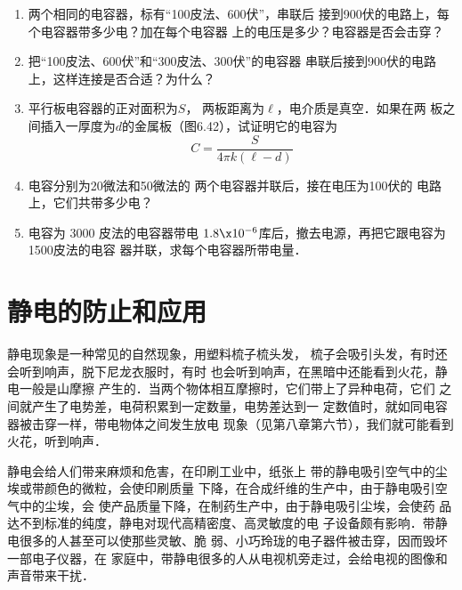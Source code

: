 \begin{enumerate}
\item 两个相同的电容器，标有“100皮法、600伏”，串联后
接到900伏的电路上，每个电容器带多少电？加在每个电容器
上的电压是多少？电容器是否会击穿？
\item 把“100皮法、600伏”和“300皮法、300伏”的电容器
串联后接到900伏的电路上，这样连接是否合适？为什么？
\item 平行板电容器的正对面积为$S$，
两板距离为$\ell$，电介质是真空．如果在两
板之间插入一厚度为$d$的金属板（图6.42），试证明它的电容为
\[C=\frac{S}{4\pi k(\ell-d)}\]
\begin{figure}[htp]\centering

    \caption{}
\end{figure}
\item 电容分别为20微法和50微法的
两个电容器并联后，接在电压为100伏的
电路上，它们共带多少电？
\item 电容为 3000 皮法的电容器带电
$1.8\x10^{-6}$库后，撤去电源，再把它跟电容为1500皮法的电容
器并联，求每个电容器所带电量．
\end{enumerate}

\section{静电的防止和应用}
静电现象是一种常见的自然现象，用塑料梳子梳头发，
梳子会吸引头发，有时还会听到响声，脱下尼龙衣服时，有时
也会听到响声，在黑暗中还能看到火花，静电一般是山摩擦
产生的．当两个物体相互摩擦时，它们带上了异种电荷，它们
之间就产生了电势差，电荷积累到一定数量，电势差达到一
定数值时，就如同电容器被击穿一样，带电物体之间发生放电
现象（见第八章第六节），我们就可能看到火花，听到响声．

静电会给人们带来麻烦和危害，在印刷工业中，纸张上
带的静电吸引空气中的尘埃或带颜色的微粒，会使印刷质量
下降，在合成纤维的生产中，由于静电吸引空气中的尘埃，会
使产品质量下降，在制药生产中，由于静电吸引尘埃，会使药
品达不到标准的纯度，静电对现代高精密度、高灵敏度的电
子设备颇有影响．带静电很多的人甚至可以使那些灵敏、脆
弱、小巧玲珑的电子器件被击穿，因而毁坏一部电子仪器，在
家庭中，带静电很多的人从电视机旁走过，会给电视的图像和
声音带来干扰．

